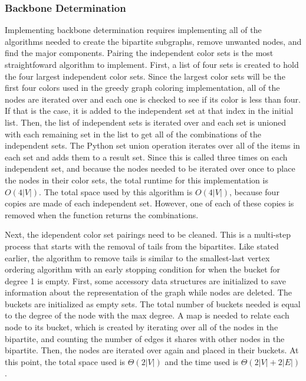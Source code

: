\documentclass{article}
\begin{document}
        \subsubsection{Backbone Determination}
        Implementing backbone determination requires implementing all of the algorithms needed to create the bipartite subgraphs, remove unwanted nodes, and find the major components. Pairing the independent color sets is the most straightfoward algorithm to implement. First, a list of four sets is created to hold the four largest independent color sets. Since the largest color sets will be the first four colors used in the greedy graph coloring implementation, all of the nodes are iterated over and each one is checked to see if its color is less than four. If that is the case, it is added to the independent set at that index in the initial list. Then, the list of independent sets is iterated over and each set is unioned with each remaining set in the list to get all of the combinations of the independent sets. The Python set union operation iterates over all of the items in each set and adds them to a result set. Since this is called three times on each independent set, and because the nodes needed to be iterated over once to place the nodes in their color sets, the total runtime for this implementation is $O(4|V|)$. The total space used by this algorithm is $O(4|V|)$, because four copies are made of each independent set. However, one of each of these copies is removed when the function returns the combinations.
        \par
        Next, the idependent color set pairings need to be cleaned. This is a multi-step process that starts with the removal of tails from the bipartites. Like stated earlier, the algorithm to remove tails is similar to the smallest-last vertex ordering algorithm with an early stopping condition for when the bucket for degree 1 is empty. First, some accessory data structures are initialized to save information about the representation of the graph while nodes are deleted. The buckets are initialized as empty sets. The total number of buckets needed is equal to the degree of the node with the max degree. A map is needed to relate each node to its bucket, which is created by iterating over all of the nodes in the bipartite, and counting the number of edges it shares with other nodes in the bipartite. Then, the nodes are iterated over again and placed in their buckets. At this point, the total space used is $\Theta(2|V|)$ and the time used is $\Theta(2|V| + 2|E|)$.
        \par
\end{document}
